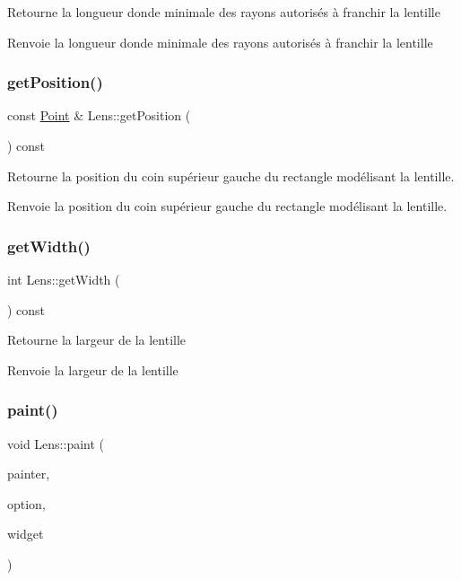 Retourne la longueur d\textquotesingle{}onde minimale des rayons autorisés à franchir la lentille \begin{DoxyReturn}{Renvoie}
la longueur d\textquotesingle{}onde minimale des rayons autorisés à franchir la lentille 
\end{DoxyReturn}
\mbox{\label{class_lens_a242443a28d03572e5fa1b9d7a066ade2}} 
\subsubsection{\texorpdfstring{getPosition()}{getPosition()}}
{\footnotesize\ttfamily const \mbox{\hyperlink{class_point}{Point}} \& Lens\+::get\+Position (\begin{DoxyParamCaption}{ }\end{DoxyParamCaption}) const}

Retourne la position du coin supérieur gauche du rectangle modélisant la lentille. \begin{DoxyReturn}{Renvoie}
la position du coin supérieur gauche du rectangle modélisant la lentille. 
\end{DoxyReturn}
\mbox{\label{class_lens_ac4e4c19fc323c3735b336428d3bc7de0}} 
\subsubsection{\texorpdfstring{getWidth()}{getWidth()}}
{\footnotesize\ttfamily int Lens\+::get\+Width (\begin{DoxyParamCaption}{ }\end{DoxyParamCaption}) const}

Retourne la largeur de la lentille \begin{DoxyReturn}{Renvoie}
la largeur de la lentille 
\end{DoxyReturn}
\mbox{\label{class_lens_a8662802e4e08ba7e889353eabdb002cc}} 
\subsubsection{\texorpdfstring{paint()}{paint()}}
{\footnotesize\ttfamily void Lens\+::paint (\begin{DoxyParamCaption}\item[{Q\+Painter $\ast$}]{painter,  }\item[{const Q\+Style\+Option\+Graphics\+Item $\ast$}]{option,  }\item[{Q\+Widget $\ast$}]{widget }\end{DoxyParamCaption})}

